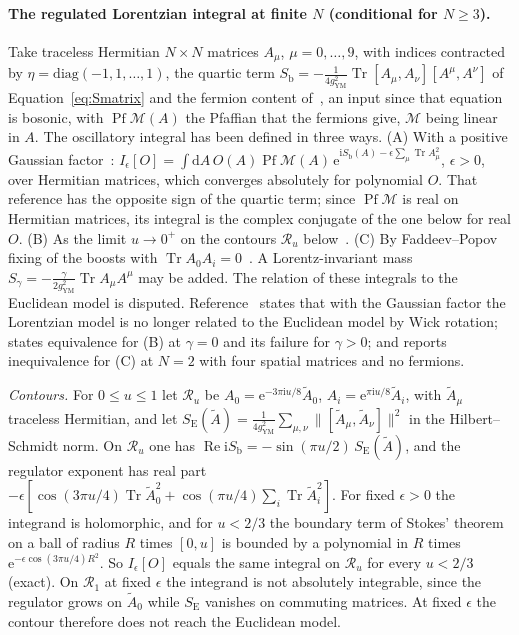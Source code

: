 \paragraph{The regulated Lorentzian integral at finite \(N\) (conditional for \(N\ge3\)).}
Take traceless Hermitian \(N\times N\) matrices \(A_\mu\), \(\mu=0,\dots,9\), with indices contracted by \(\eta=\mathrm{diag}(-1,1,\dots,1)\), the quartic term \(S_{\mathrm b}=-\tfrac1{4g_{\mathrm{YM}}^2}\operatorname{Tr}[A_\mu,A_\nu][A^\mu,A^\nu]\) of Equation~\eqref{eq:Smatrix} and the fermion content of~\cite{IKKT1997}, an input since that equation is bosonic, with \(\operatorname{Pf}\mathcal M(A)\) the Pfaffian that the fermions give, \(\mathcal M\) being linear in \(A\). The oscillatory integral has been defined in three ways. (A) With a positive Gaussian factor~\cite{Steinacker2026Invitation}: \(I_\epsilon[O]=\int\mathrm dA\,O(A)\operatorname{Pf}\mathcal M(A)\,\mathrm e^{\mathrm iS_{\mathrm b}(A)-\epsilon\sum_\mu\operatorname{Tr}A_\mu^2}\), \(\epsilon>0\), over Hermitian matrices, which converges absolutely for polynomial \(O\). That reference has the opposite sign of the quartic term; since \(\operatorname{Pf}\mathcal M\) is real on Hermitian matrices, its integral is the complex conjugate of the one below for real \(O\). (B) As the limit \(u\to0^+\) on the contours \(\mathcal R_u\) below~\cite{Anagnostopoulos2026}. (C) By Faddeev--Popov fixing of the boosts with \(\operatorname{Tr}A_0A_i=0\)~\cite{AsanoNishimuraPiensukYamamori2025}. A Lorentz-invariant mass \(S_\gamma=-\tfrac{\gamma}{2g_{\mathrm{YM}}^2}\operatorname{Tr}A_\mu A^\mu\) may be added. The relation of these integrals to the Euclidean model is disputed. Reference~\cite{Steinacker2026Invitation} states that with the Gaussian factor the Lorentzian model is no longer related to the Euclidean model by Wick rotation; \cite{Anagnostopoulos2026} states equivalence for (B) at \(\gamma=0\) and its failure for \(\gamma>0\); and \cite{ChouNishimuraTripathi2025} reports inequivalence for (C) at \(N=2\) with four spatial matrices and no fermions.

\emph{Contours.} For \(0\le u\le1\) let \(\mathcal R_u\) be \(A_0=\mathrm e^{-3\pi\mathrm iu/8}\tilde A_0\), \(A_i=\mathrm e^{\pi\mathrm iu/8}\tilde A_i\), with \(\tilde A_\mu\) traceless Hermitian, and let \(S_{\mathrm E}(\tilde A)=\tfrac1{4g_{\mathrm{YM}}^2}\sum_{\mu,\nu}\|[\tilde A_\mu,\tilde A_\nu]\|^2\) in the Hilbert--Schmidt norm. On \(\mathcal R_u\) one has \(\operatorname{Re}\mathrm iS_{\mathrm b}=-\sin(\pi u/2)\,S_{\mathrm E}(\tilde A)\), and the regulator exponent has real part \(-\epsilon[\cos(3\pi u/4)\operatorname{Tr}\tilde A_0^2+\cos(\pi u/4)\sum_i\operatorname{Tr}\tilde A_i^2]\). For fixed \(\epsilon>0\) the integrand is holomorphic, and for \(u<2/3\) the boundary term of Stokes' theorem on a ball of radius \(R\) times \([0,u]\) is bounded by a polynomial in \(R\) times \(\mathrm e^{-\epsilon\cos(3\pi u/4)R^2}\). So \(I_\epsilon[O]\) equals the same integral on \(\mathcal R_u\) for every \(u<2/3\) (exact). On \(\mathcal R_1\) at fixed \(\epsilon\) the integrand is not absolutely integrable, since the regulator grows on \(\tilde A_0\) while \(S_{\mathrm E}\) vanishes on commuting matrices. At fixed \(\epsilon\) the contour therefore does not reach the Euclidean model.

